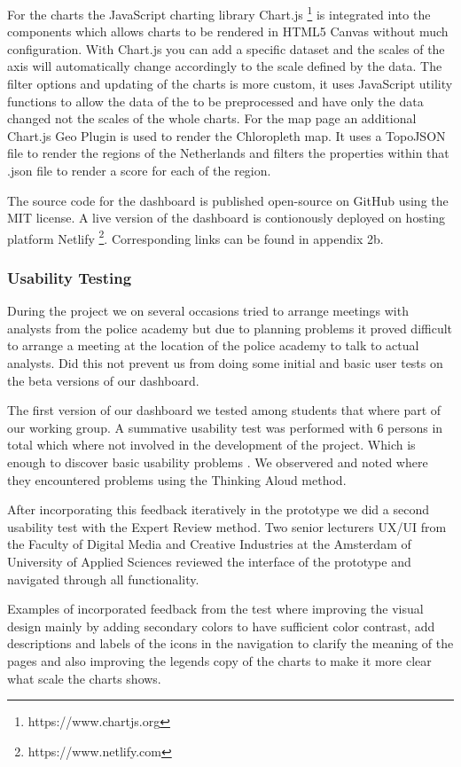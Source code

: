For the charts the JavaScript charting library Chart.js \footnote{https://www.chartjs.org} is integrated into the components which allows charts to be rendered in HTML5 Canvas without much configuration. With Chart.js you can add a specific dataset and the scales of the axis will automatically change accordingly to the scale defined by the data. The filter options and updating of the charts is more custom, it uses JavaScript utility functions to allow the data of the to be preprocessed and have only the data changed not the scales of the whole charts. For the map page an additional Chart.js Geo Plugin is used to render the Chloropleth map. It uses a TopoJSON file to render the regions of the Netherlands and filters the properties within that .json file to render a score for each of the region.

The source code for the dashboard is published open-source on GitHub using the MIT license. A live version of the dashboard is contionously deployed on hosting platform Netlify \footnote{https://www.netlify.com}. Corresponding links can be found in appendix 2b.

\subsubsection {Usability Testing}\hfill

During the project we on several occasions tried to arrange meetings with analysts from the police academy but due to planning problems it proved difficult to arrange a meeting at the location of the police academy to talk to actual analysts. Did this not prevent us from doing some initial and basic user tests on the beta versions of our dashboard. 

The first version of our dashboard we tested among students that where part of our working group. A summative usability test was performed with 6 persons in total which where not involved in the development of the project. Which is enough to discover basic usability problems \cite{nielsen}. We observered and noted where they encountered problems using the Thinking Aloud method. 

After incorporating this feedback iteratively in the prototype we did a second usability test with the Expert Review method. Two senior lecturers UX/UI from the Faculty of Digital Media and Creative Industries at the Amsterdam of University of Applied Sciences reviewed the interface of the prototype and navigated through all functionality.

Examples of incorporated feedback from the test where improving the visual design mainly by adding secondary colors to have sufficient color contrast, add descriptions and labels of the icons in the navigation to clarify the meaning of the pages and also improving the legends copy of the charts to make it more clear what scale the charts shows.